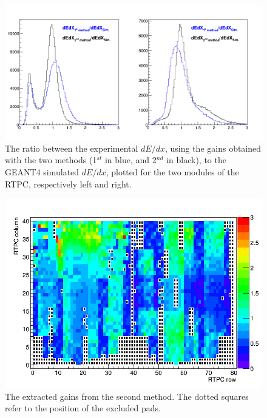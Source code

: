 \begin{figure}[tbp]
\centering
\includegraphics[scale=0.400]{fig_rtpc/dedx_p_sim_exp_2nd.png}
\caption{The ratio between the experimental $dE/dx$, using the gains obtained with the two methods (1$^{st}$ in blue, and 2$^{nd}$ in black), to the GEANT4 simulated $dE/dx$, plotted for the two modules of the RTPC, respectively left and right. }
\label{fig:dedx_p_exp_2nd}
\end{figure}

\begin{figure}[tbp]
\centering
\includegraphics[scale=0.300]{fig_rtpc/pad_row_col.png}
\caption{The extracted gains from the second method. The dotted squares refer to the position of the excluded pads.}
\label{fig:pad_row_col}
\end{figure}

